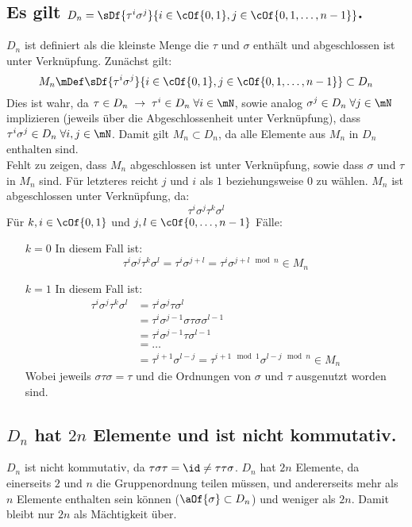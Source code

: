 \subsection{Es gilt $D_n = \sDf{\tau^i\sigma^j}{i\in\cOf{0,1}, j\in\cOf{0,1,\dots,n-1}}$.}
$D_n$ ist definiert als die kleinste Menge die $\tau$ und $\sigma$ enthält und abgeschlossen ist unter Verknüpfung. Zunächst gilt:
\begin{equation}
	M_n \mDef \sDf{\tau^i\sigma^j}{i\in\cOf{0,1}, j\in\cOf{0,1,\dots,n-1}} \subset D_n
\end{equation}
Dies ist wahr, da $\tau\in D_n\;\rightarrow\;\tau^i\in D_n\;\forall i \in \mN$, sowie analog $\sigma^j\in D_n\;\forall j \in \mN$ implizieren (jeweils über die Abgeschlossenheit unter Verknüpfung), dass $\tau^i\sigma^j\in D_n\;\forall i,j\in\mN$. Damit gilt $M_n \subset D_n$, da alle Elemente aus $M_n$ in $D_n$ enthalten sind.\\
Fehlt zu zeigen, dass $M_n$ abgeschlossen ist unter Verknüpfung, sowie dass $\sigma$ und $\tau$ in $M_n$ sind. Für letzteres reicht $j$ und $i$ als $1$ beziehungsweise $0$ zu wählen. $M_n$ ist abgeschlossen unter Verknüpfung, da:
\begin{equation}
	\tau^i\sigma^j\tau^k\sigma^l
\end{equation}
Für $k,i\in\cOf{0,1}$ und $j,l\in\cOf{0,\dots,n-1}$ Fälle:
\begin{enumerate}
	\item[$k=0$] In diesem Fall ist:
	\begin{equation}
		\tau^i\sigma^j\tau^k\sigma^l = \tau^i\sigma^{j+l} = \tau^i\sigma^{j+l \mod n} \in M_n
	\end{equation}
	\item[$k=1$] In diesem Fall ist:
	\begin{align}
		\tau^i\sigma^j\tau^k\sigma^l & = \tau^i\sigma^j\tau\sigma^l\\
		& = \tau^i\sigma^{j-1}\sigma\tau\sigma\sigma^{l-1}\\
		& = \tau^i\sigma^{j-1}\tau\sigma^{l-1}\\
		& = \dots \\
		& = \tau^{i+1}\sigma^{l-j} = \tau^{i+1 \mod 1}\sigma^{l-j \mod n} \in M_n
	\end{align}
	Wobei jeweils $\sigma\tau\sigma = \tau$ und die Ordnungen von $\sigma$ und $\tau$ ausgenutzt worden sind.
\end{enumerate}

\subsection{$D_n$ hat $2n$ Elemente und ist nicht kommutativ.}
$D_n$ ist nicht kommutativ, da $\tau\sigma\tau = \id \neq \tau\tau\sigma$. $D_n$ hat $2n$ Elemente, da einerseits $2$ und $n$ die Gruppenordnung teilen müssen, und andererseits mehr als $n$ Elemente enthalten sein können ($\aOf{\sigma} \subset D_n$) und weniger als $2n$. Damit bleibt nur $2n$ als Mächtigkeit über.
